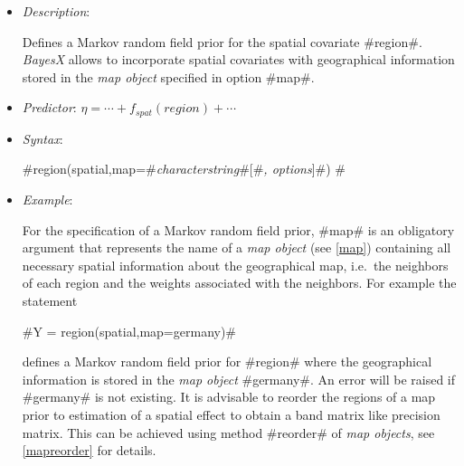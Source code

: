 \begin{itemize}

\item[] {\em Description}:

Defines a Markov random field prior for the spatial covariate
#region#. {\em BayesX} allows to incorporate spatial covariates
with geographical information stored in the {\em map object}
specified in option #map#.

\item[] {\em Predictor}: $\eta = \cdots + f_{spat}(region) +
\cdots$

\item[] {\em Syntax}:

#region(spatial,map=#{\em characterstring}#[#{\em , options}]#) #
\item[] {\em Example}:

For the specification of a Markov random field prior, #map# is an
obligatory argument that represents the name of a {\em map object}
(see \autoref{map}) containing all necessary spatial information
about the geographical map, i.e.~the neighbors of each region and
the weights associated with the neighbors. For example the
statement

#Y = region(spatial,map=germany)#

defines a Markov random field prior for #region# where the
geographical information is stored in the {\em map object}
#germany#. An error will be raised if #germany# is not existing.
It is advisable to reorder the regions of a map prior to
estimation of a spatial effect to obtain a band matrix like
precision matrix. This can be achieved using method #reorder# of
{\em map objects}, see \autoref{mapreorder} for details.




\end{itemize}
